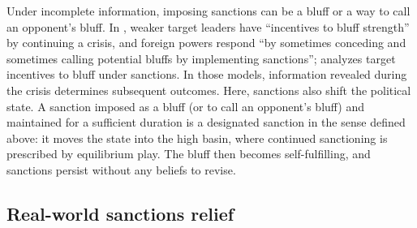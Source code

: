  Under incomplete information, imposing sanctions can be a bluff or a way
to call an opponent's bluff. In \citet[pp.~735--736]{Spaniel2015}, weaker target leaders
have ``incentives to bluff strength'' by continuing a crisis, and foreign powers respond
``by sometimes conceding and sometimes calling potential bluffs by implementing
sanctions''; \citet[p.~77]{Brekhov2022} analyzes target incentives to bluff under
sanctions. In those models, information revealed during the crisis determines subsequent
outcomes. Here, sanctions also shift the political state. A sanction imposed as a
bluff (or to call an opponent's bluff) and maintained for a sufficient duration is
a designated sanction in the sense defined above: it moves the state into the high basin,
where continued sanctioning is prescribed by equilibrium play. The bluff then becomes
self-fulfilling, and sanctions persist without any beliefs to revise.

\subsection{Real-world sanctions relief}
\label{sec:discussion:relief}
\label{sec:discussion:evidence}

